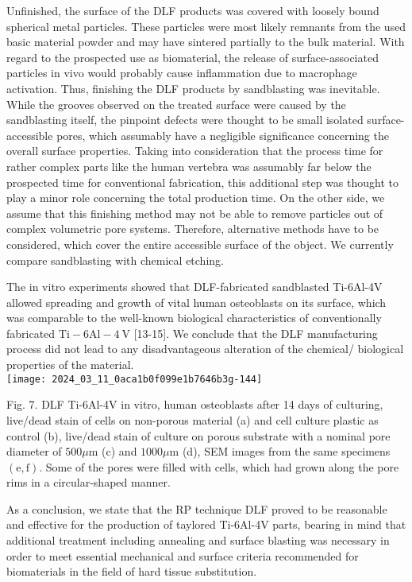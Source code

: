 \documentclass[10pt]{article}
\begin{document}
Unfinished, the surface of the DLF products was covered with loosely bound spherical metal particles. These particles were most likely remnants from the used basic material powder and may have sintered partially to the bulk material. With regard to the prospected use as biomaterial, the release of surface-associated particles in vivo would probably cause inflammation due to macrophage activation. Thus, finishing the DLF products by sandblasting was inevitable. While the grooves observed on the treated surface were caused by the sandblasting itself, the pinpoint defects were thought to be small isolated surface-accessible pores, which assumably have a negligible significance concerning the overall surface properties. Taking into consideration that the process time for rather complex parts like the human vertebra was assumably far below the prospected time for conventional fabrication, this additional step was thought to play a minor role concerning the total production time. On the other side, we assume that this finishing method may not be able to remove particles out of complex volumetric pore systems. Therefore, alternative methods have to be considered, which cover the entire accessible surface of the object. We currently compare sandblasting with chemical etching.

The in vitro experiments showed that DLF-fabricated sandblasted Ti-6Al-4V allowed spreading and growth of vital human osteoblasts on its surface, which was comparable to the well-known biological characteristics of conventionally fabricated $\mathrm{Ti}-6 \mathrm{Al}-4 \mathrm{~V}$ [13-15]. We conclude that the DLF manufacturing process did not lead to any disadvantageous alteration of the chemical/ biological properties of the material.\\
\texttt{[image: 2024\_03\_11\_0aca1b0f099e1b7646b3g-144]}

Fig. 7. DLF Ti-6Al-4V in vitro, human osteoblasts after 14 days of culturing, live/dead stain of cells on non-porous material (a) and cell culture plastic as control (b), live/dead stain of culture on porous substrate with a nominal pore diameter of $500 \mu \mathrm{m}$ (c) and $1000 \mu \mathrm{m}$ (d), SEM images from the same specimens $(\mathrm{e}, \mathrm{f})$. Some of the pores were filled with cells, which had grown along the pore rims in a circular-shaped manner.

As a conclusion, we state that the RP technique DLF proved to be reasonable and effective for the production of taylored Ti-6Al-4V parts, bearing in mind that additional treatment including annealing and surface blasting was necessary in order to meet essential mechanical and surface criteria recommended for biomaterials in the field of hard tissue substitution.
\end{document}
